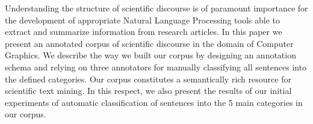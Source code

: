 Understanding the structure of scientific discourse is of paramount importance for the development of appropriate Natural Language Processing tools able to extract and summarize information from research articles. In this paper we present an annotated corpus of scientific discourse in the domain of Computer Graphics. We describe the way we built our corpus by designing an annotation schema and relying on three annotators for manually classifying all sentences into the defined categories. Our corpus constitutes a semantically rich resource for scientific text mining. In this respect, we also present the results of our initial experiments of automatic classification of sentences into the 5 main categories in our corpus.
